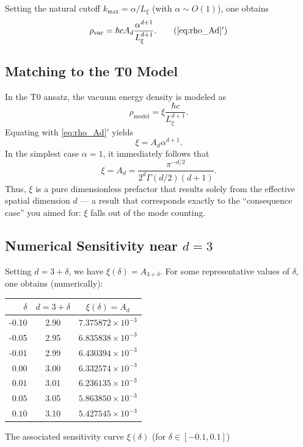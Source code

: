	Setting the natural cutoff \(k_{\max}=\alpha/L_\xi\) (with \(\alpha\sim O(1)\)), one obtains
	\[
	\rho_{\mathrm{vac}} = \hbar c  A_d  \frac{\alpha^{d+1}}{L_\xi^{d+1}}.
	\tag{\ref{eq:rho_Ad}$'$}
	\]
	
	\subsection{Matching to the T0 Model}
	In the T0 ansatz, the vacuum energy density is modeled as
	\[
	\rho_{\mathrm{model}}=\xi\frac{\hbar c}{L_\xi^{d+1}}.
	\]
	Equating with \eqref{eq:rho_Ad}$'$ yields
	\[
	\boxed{\xi = A_d\alpha^{d+1}}.
	\]
	In the simplest case \(\alpha=1\), it immediately follows that
	\[
	\boxed{\xi = A_d = \dfrac{\pi^{-d/2}}{2^d\Gamma(d/2)(d+1)}}.
	\]
	Thus, \(\xi\) is a pure dimensionless prefactor that results solely from the effective spatial dimension \(d\) — a result that corresponds exactly to the ``consequence case'' you aimed for: \(\xi\) falls out of the mode counting.
	
	\subsection{Numerical Sensitivity near \(d=3\)}
	Setting \(d=3+\delta\), we have \(\xi(\delta)=A_{3+\delta}\). For some representative values of \(\delta\), one obtains (numerically):
	\begin{center}
		\begin{tabular}{r c c}
			\toprule
			\(\delta\) & \(d=3+\delta\) & \(\xi(\delta)=A_d\) \\
			\midrule
			-0.10 & 2.90 & \(7.375872\times10^{-3}\) \\
			-0.05 & 2.95 & \(6.835838\times10^{-3}\) \\
			-0.01 & 2.99 & \(6.430394\times10^{-3}\) \\
			\(0.00\) & 3.00 & \(6.332574\times10^{-3}\) \\
			\(0.01\) & 3.01 & \(6.236135\times10^{-3}\) \\
			\(0.05\) & 3.05 & \(5.863850\times10^{-3}\) \\
			\(0.10\) & 3.10 & \(5.427545\times10^{-3}\) \\
			\bottomrule
		\end{tabular}
	\end{center}
	
	The associated sensitivity curve \(\xi(\delta)\) (for \(\delta\in[-0.1,0.1]\)) 
	
	
